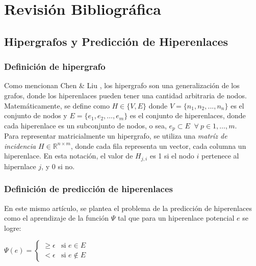 \chapter{Revisión Bibliográfica}

\section{Hipergrafos y Predicción de Hiperenlaces}

\subsection{Definición de hipergrafo}

Como mencionan Chen \& Liu \cite{Chen_2024}, los hipergrafo son una generalización de los grafos, donde los hiperenlaces pueden tener una cantidad arbitraria de nodos.
Matemáticamente, se define como \begin{math} H \in \{V,E\}\end{math} donde $V=\{n_{1},n_{2},...,n_{n}\}$ es el conjunto de nodos y $E=\{e_{1},e_{2},\dots,e_{m}\}$ es el conjunto de hiperenlaces, donde cada hiperenlace es un subconjunto de nodos, o sea, $e_{p} \subset E \; \; \forall \: p \in 1,\dots,m$.\\

Para representar matricialmente un hipergrafo, se utiliza una \textit{matríz de incidencia} $H \in \mathbb{R}^{n \times m}$, donde cada fila representa un vector, cada columna un hiperenlace. En esta notación, el valor de $H_{j,i}$ es 1 si el nodo $i$ pertenece al hipernlace $j$, y 0 si no.\\


\subsection{Definición de predicción de hiperenlaces}
En este mismo artículo, se plantea el problema de la predicción de hiperenlaces como el aprendizaje de la función $\Psi $ tal que para un hiperenlace potencial $e$ se logre:

\begin{center}
    \begin{math}
        \Psi (e) = 
        \begin{cases}
            \geq \epsilon &\text{si $e \in E$}\\
            < \epsilon &\text{si $e \notin E$}
        \end{cases}
    \end{math}
\end{center}

